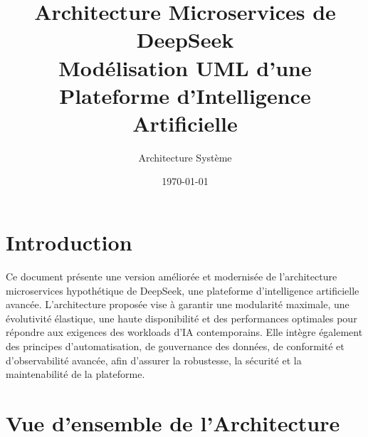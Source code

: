 \documentclass[12pt,a4paper]{article}
\title{\textbf{Architecture Microservices de DeepSeek} \\ 
       \large Modélisation UML d'une Plateforme d'Intelligence Artificielle}
\author{Architecture Système}
\date{\today}
\begin{document}
\maketitle
\tableofcontents
\newpage

\section{Introduction}

Ce document présente une version améliorée et modernisée de l'architecture microservices hypothétique de DeepSeek, une plateforme d'intelligence artificielle avancée. L'architecture proposée vise à garantir une modularité maximale, une évolutivité élastique, une haute disponibilité et des performances optimales pour répondre aux exigences des workloads d’IA contemporains. Elle intègre également des principes d’automatisation, de gouvernance des données, de conformité et d’observabilité avancée, afin d’assurer la robustesse, la sécurité et la maintenabilité de la plateforme.

\section{Vue d'ensemble de l'Architecture}
\end{document}
